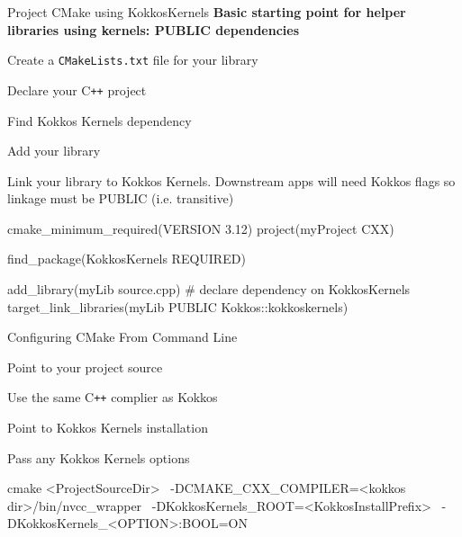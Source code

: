 \begin{frame}[fragile]{Project CMake using KokkosKernels}
\textbf{Basic starting point for helper libraries using kernels: PUBLIC dependencies}
\begin{itemize}
\item Create a \texttt{CMakeLists.txt} file for your library
 { \item Declare your C\texttt{++} project }
 { \item Find Kokkos Kernels dependency }
 { \item Add your library  }
 { \item Link your library to Kokkos Kernels. Downstream apps will need Kokkos flags so linkage must be PUBLIC (i.e. transitive) }
\end{itemize}

\begin{cmake}[linebackground={
  \btLstHL<2>{2}{orange!30}
  \btLstHL<3>{4}{orange!30}
  \btLstHL<4>{7}{orange!30}
  \btLstHL<5>{9-10}{orange!30}    
}]
    cmake_minimum_required(VERSION 3.12)
    project(myProject CXX)

    find_package(KokkosKernels REQUIRED)

    add_library(myLib source.cpp)
    # declare dependency on KokkosKernels
    target_link_libraries(myLib PUBLIC 
                 Kokkos::kokkoskernels)
\end{cmake}
\end{frame}




\begin{frame}[fragile]{Configuring CMake From Command Line}
\begin{itemize}
 { \item Point to your project source }
 { \item Use the same C\texttt{++} complier as Kokkos }
 { \item Point to Kokkos Kernels installation  }
 { \item Pass any Kokkos Kernels options }
\end{itemize}
\begin{shell}[linebackground={
  \btLstHL<2>{1}{orange!30}
  \btLstHL<3>{2}{orange!30}
  \btLstHL<4>{3}{orange!30}
  \btLstHL<5>{4}{orange!30}    
}]
    cmake <ProjectSourceDir> \
      -DCMAKE_CXX_COMPILER=<kokkos dir>/bin/nvcc_wrapper \
      -DKokkosKernels_ROOT=<KokkosInstallPrefix> \
      -DKokkosKernels_<OPTION>:BOOL=ON 
\end{shell}
\end{frame}

